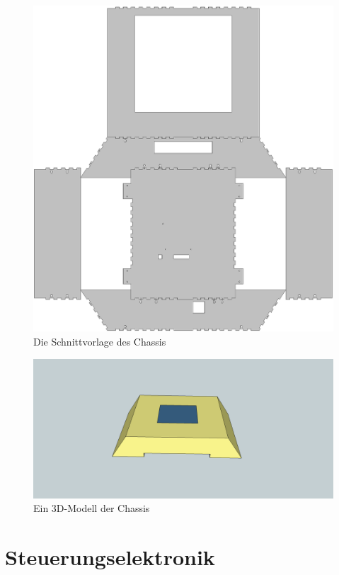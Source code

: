 \documentclass[a4paper,bibtotoc,oneside]{scrbook}
\begin{document}
\begin{figure}[htbp]
\centering
\includegraphics[width=125mm]{img/gehause3.png}
\caption[Chassis]{Die Schnittvorlage des Chassis}\label{gehause}
\end{figure}

\begin{figure}[htbp]
\centering
\includegraphics[width=125mm]{img/robo3d.png}
\caption[Chassis]{Ein 3D-Modell der Chassis}\label{robo3d}
\end{figure}


\section{Steuerungselektronik}\thispagestyle{empty}
\end{document}
